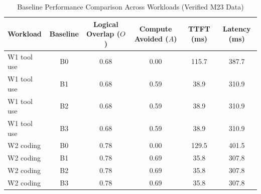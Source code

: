 \begin{table}[t]
\centering
\caption{Baseline Performance Comparison Across Workloads (Verified M23 Data)}
\label{tab:baselines}
\begin{tabular}{lccccc}
\toprule
\textbf{Workload} & \textbf{Baseline} & \textbf{Logical Overlap ($O$)} & \textbf{Compute Avoided ($A$)} & \textbf{TTFT (ms)} & \textbf{Latency (ms)} \\
\midrule
W1 tool use & B0 & 0.68 & 0.00 & 115.7 & 387.7 \\
W1 tool use & B1 & 0.68 & 0.59 & 38.9 & 310.9 \\
W1 tool use & B2 & 0.68 & 0.59 & 38.9 & 310.9 \\
W1 tool use & B3 & 0.68 & 0.59 & 38.9 & 310.9 \\
W2 coding & B0 & 0.78 & 0.00 & 129.5 & 401.5 \\
W2 coding & B1 & 0.78 & 0.69 & 35.8 & 307.8 \\
W2 coding & B2 & 0.78 & 0.69 & 35.8 & 307.8 \\
W2 coding & B3 & 0.78 & 0.69 & 35.8 & 307.8 \\
\bottomrule
\end{tabular}
\end{table}
